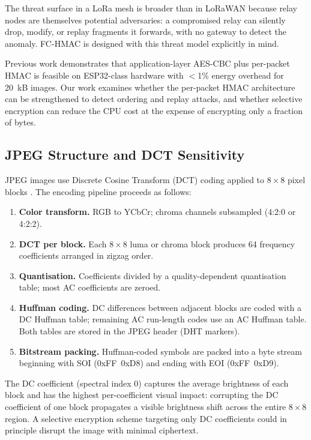 \documentclass[journal]{IEEEtran}
\begin{document}
The threat surface in a LoRa mesh is broader than in LoRaWAN because relay
nodes are themselves potential adversaries: a compromised relay can silently
drop, modify, or replay fragments it forwards, with no gateway to detect the
anomaly.  FC-HMAC is designed with this threat model explicitly in mind.

Previous work \cite{ryczek2025} demonstrates that application-layer AES-CBC
plus per-packet HMAC is feasible on ESP32-class hardware with $<$1\% energy
overhead for 20~kB images.  Our work examines whether the per-packet HMAC
architecture can be strengthened to detect ordering and replay attacks, and
whether selective encryption can reduce the CPU cost at the expense of
encrypting only a fraction of bytes.

\subsection{JPEG Structure and DCT Sensitivity}

JPEG images use Discrete Cosine Transform (DCT) coding applied to $8\times8$
pixel blocks \cite{jpeg_iso}.  The encoding pipeline proceeds as follows:

\begin{enumerate}
  \item \textbf{Color transform.}  RGB to YCbCr; chroma channels subsampled
    (4:2:0 or 4:2:2).
  \item \textbf{DCT per block.}  Each $8\times 8$ luma or chroma block produces
    64 frequency coefficients arranged in zigzag order.
  \item \textbf{Quantisation.}  Coefficients divided by a quality-dependent
    quantisation table; most AC coefficients are zeroed.
  \item \textbf{Huffman coding.}  DC differences between adjacent blocks are
    coded with a DC Huffman table; remaining AC run-length codes use an AC
    Huffman table.  Both tables are stored in the JPEG header (DHT markers).
  \item \textbf{Bitstream packing.}  Huffman-coded symbols are packed into a
    byte stream beginning with SOI (0xFF~0xD8) and ending with EOI (0xFF~0xD9).
\end{enumerate}

The DC coefficient (spectral index 0) captures the average brightness of each
block and has the highest per-coefficient visual impact: corrupting the DC
coefficient of one block propagates a visible brightness shift across the entire
$8\times8$ region.  A selective encryption scheme targeting only DC coefficients
could in principle disrupt the image with minimal ciphertext.
\end{document}
